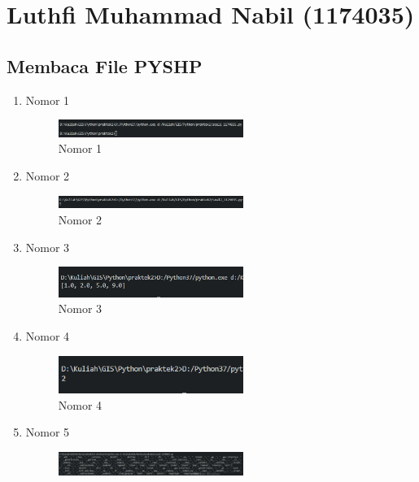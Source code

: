 \section{Luthfi Muhammad Nabil (1174035)}
\subsection{Membaca File PYSHP}
\begin{enumerate}
    \item Nomor 1
    
    \begin{figure}[H]
		\includegraphics[width=6cm]{figures/1174035/tugas3/soal1_result.png}
		\centering
		\caption{Nomor 1}
	\end{figure}
    \item Nomor 2
    
    \begin{figure}[H]
		\includegraphics[width=6cm]{figures/1174035/tugas3/soal2_result.png}
		\centering
		\caption{Nomor 2}
    \end{figure}
    \item Nomor 3
    
    \begin{figure}[H]
		\includegraphics[width=6cm]{figures/1174035/tugas3/soal3_result.png}
		\centering
		\caption{Nomor 3}
    \end{figure}
    \item Nomor 4
    
    \begin{figure}[H]
		\includegraphics[width=6cm]{figures/1174035/tugas3/soal4_result.png}
		\centering
		\caption{Nomor 4}
    \end{figure}
    \item Nomor 5
    
    \begin{figure}[H]
		\includegraphics[width=6cm]{figures/1174035/tugas3/soal5_result.png}

\end{figure}
\end{enumerate}
